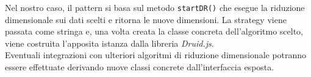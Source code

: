 Nel nostro caso, il pattern si basa sul metodo \texttt{startDR()} che esegue la riduzione dimensionale sui dati scelti e ritorna le nuove dimensioni. La strategy viene passata come stringa e, una volta creata la classe concreta dell'algoritmo scelto, viene costruita l'apposita istanza dalla libreria \textit{Druid.js}.\\Eventuali integrazioni con ulteriori algoritmi di riduzione dimensionale potranno essere effettuate derivando nuove classi concrete dall'interfaccia esposta.